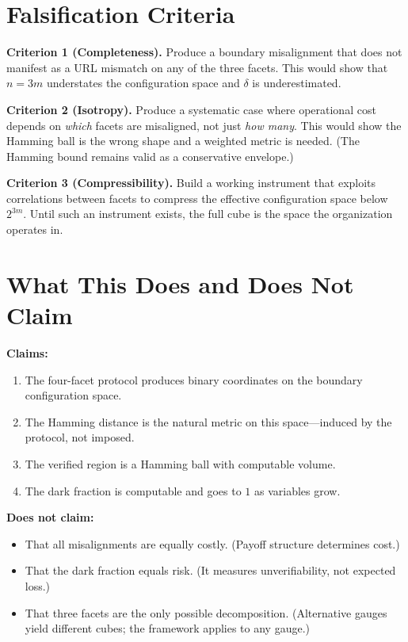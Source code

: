 \documentclass[11pt,a4paper]{article}
\begin{document}
\section{Falsification Criteria}
\label{sec:falsification}

\noindent\textbf{Criterion 1 (Completeness).} Produce a boundary misalignment that does not manifest as a URL mismatch on any of the three facets. This would show that $n = 3m$ understates the configuration space and $\delta$ is underestimated.

\medskip\noindent\textbf{Criterion 2 (Isotropy).} Produce a systematic case where operational cost depends on \emph{which} facets are misaligned, not just \emph{how many}. This would show the Hamming ball is the wrong shape and a weighted metric is needed. (The Hamming bound remains valid as a conservative envelope.)

\medskip\noindent\textbf{Criterion 3 (Compressibility).} Build a working instrument that exploits correlations between facets to compress the effective configuration space below $2^{3m}$. Until such an instrument exists, the full cube is the space the organization operates in.

\section{What This Does and Does Not Claim}
\label{sec:scope}

\textbf{Claims:}
\begin{enumerate}
\item The four-facet protocol produces binary coordinates on the boundary configuration space.
\item The Hamming distance is the natural metric on this space---induced by the protocol, not imposed.
\item The verified region is a Hamming ball with computable volume.
\item The dark fraction is computable and goes to $1$ as variables grow.
\end{enumerate}

\noindent\textbf{Does not claim:}
\begin{itemize}
\item That all misalignments are equally costly. (Payoff structure determines cost.)
\item That the dark fraction equals risk. (It measures unverifiability, not expected loss.)
\item That three facets are the only possible decomposition. (Alternative gauges yield different cubes; the framework applies to any gauge.)
\end{itemize}
\end{document}
